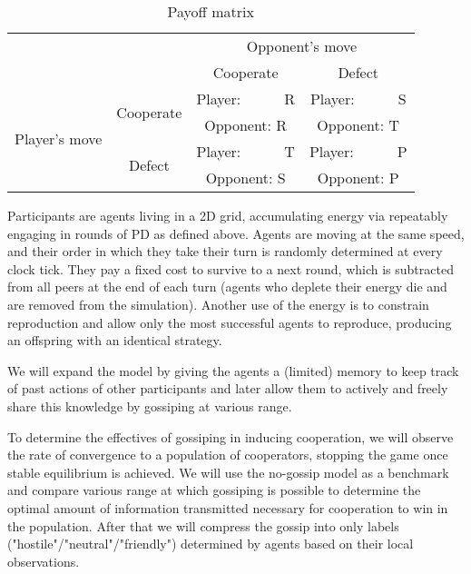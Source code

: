 \documentclass[english]{article}
\begin{document}
\begin{table}[h!]
  \centering
  \begin{tabular}{c c||c|c}
    & & \multicolumn{2}{c}{Opponent's move} \\
    & & Cooperate & Defect \\
    \hline\hline

    \multirow{4}{6em}{Player's move}
    & \multirow{2}{5em}{Cooperate}
      & Player:\ \ \ \ \ \ R & Player:\ \ \ \ \ \ S \\
    & & Opponent: R & Opponent: T \\
    \cline{2-4}
    & \multirow{2}{5em}{Defect}
      & Player:\ \ \ \ \ \ T & Player:\ \ \ \ \ \ P \\
    & & Opponent: S & Opponent: P \\
  \end{tabular}

  \caption{Payoff matrix}
  \label{table:payoff}
\end{table}

Participants are agents living in a 2D grid, accumulating energy via repeatably engaging in rounds of PD as defined above. Agents are moving at the same speed, and their order in which they take their turn is randomly determined at every clock tick. They pay a fixed cost to survive to a next round, which is subtracted from all peers at the end of each turn (agents who deplete their energy die and are removed from the simulation).
Another use of the energy is to constrain reproduction and allow only the most successful agents to reproduce, producing an offspring with an identical strategy.

We will expand the model by giving the agents a (limited) memory to keep track of past actions of other participants and later allow them to actively and freely share this knowledge by gossiping at various range.

To determine the effectives of gossiping in inducing cooperation, we will observe the rate of convergence to a population of cooperators, stopping the game once stable equilibrium is achieved. We will use the no-gossip model as a benchmark and compare various range at which gossiping is possible to determine the optimal amount of information transmitted necessary for cooperation to win in the population.
After that we will compress the gossip into only labels ("hostile"/"neutral"/"friendly") determined by agents based on their local observations.
\end{document}
